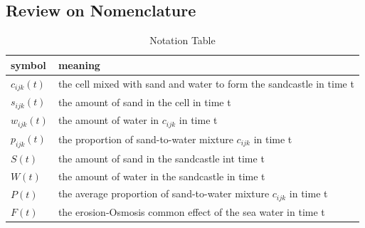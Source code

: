 \documentclass[12pt]{article}
\begin{document}
\subsection{Review on Nomenclature}
\begin{table}[H]
    \caption{Notation Table}
    \vspace{10pt}
    \centering
    \begin{tabular}{ |l| p{5cm}| } 
        \hline
        symbol       & meaning                                                             \\
        \hline
        $c_{ijk}(t)$ & the cell mixed with sand and water to form the sandcastle in time t \\
        $s_{ijk}(t)$ & the amount of sand in the cell in time t                            \\
        $w_{ijk}(t)$ & the amount of water in  $c_{ijk}$ in time t                         \\
        $p_{ijk}(t)$ & the proportion of sand-to-water mixture $c_{ijk}$ in time t         \\
        $S(t)$       & the amount of sand in the sandcastle	int time t                      \\
        $W(t)$       & the amount of water in the sandcastle in time t                     \\
        $P(t)$       & the average proportion of sand-to-water mixture $c_{ijk}$ in time t \\
        $F(t)$       & the erosion-Osmosis common effect of the sea water in time t        \\
        \hline
    \end{tabular}
    \label{bs1}
\end{table}
\end{document}
